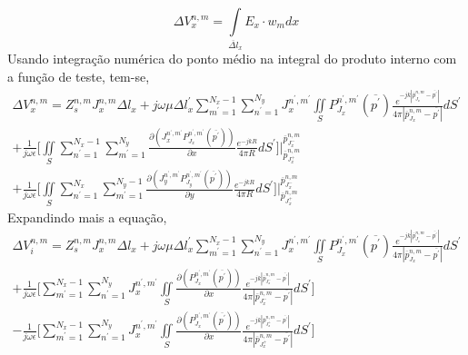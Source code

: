 \documentclass[
	12pt,				%
	openright,			%
	oneside,			%
	a4paper,			%
	english,			%
	brazil				%
	]{abntex2}
\begin{document}
\begin{apendicesenv}
\begin{equation}
     \Delta V_{x}^{n,m}=\int \limits_{\overline{\Delta l}_x}E_{x} \cdot w_m dx
\end{equation}
Usando integração numérica do ponto médio na integral do produto interno com a função de teste,  tem-se,
\begin{equation}
\begin{aligned}
      \Delta V_{x}^{n,m}= Z_s^{n,m}  J_{x}^{n,m}  {\Delta l}_x
      +
j\omega \mu   {\Delta l}^{{'}}_x \sum_{m^{'}=1}^{N_x-1}\sum_{n^{'}=1}^{N_y} J_{x}^{n^{'},m^{'}} \iint\limits_{S}  P_{J_x}^{n^{'},m^{'}}(\overline{p^{'}})   \frac{e^{-j k |\overline{p}_{{J_x}}^{n,m}-\overline{p^{'}}|}}{4 \pi |\overline{p}_{{J_x}}^{n,m}-\overline{p^{'}}|} dS^{'}    \\
   + 
   \frac{1}{j\omega \epsilon}\biggl[ \iint\limits_{S} \sum_{n^{'}=1}^{N_x-1}\sum_{m^{'}=1}^{N_y}\frac{\partial (J_{x}^{n^{'},m^{'}}P_{J_x}^{n^{'},m^{'}}(\overline{p^{'}})  )}{\partial x}  \frac{e^{-j k R}}{4 \pi R} dS^{'}  \biggl] \biggl |_{\overline{p}_{{J_x^{+}}}^{n,m}}^{\overline{p}_{{J_x^{-}}}^{n,m}}\\
  + 
  \frac{1}{j\omega \epsilon}\biggl[ \iint\limits_{S}\sum_{n^{'}=1}^{N_x}\sum_{m^{'}=1}^{N_y-1} \frac{\partial (J_{y}^{n^{'},m^{'}}P_{J_y}^{n^{'},m^{'}} (\overline{p^{'}})    )}{\partial y}  \frac{e^{-j k R}}{4 \pi R} dS^{'}  \biggl] \biggl |_{\overline{p}_{{J_x^{+}}}^{n,m}}^{\overline{p}_{{J_x^{-}}}^{n,m}}
\end{aligned}
\end{equation}
Expandindo mais a equação,
\begin{equation}
\begin{aligned}
      \Delta V_i^{n,m}=Z_s^{n,m}  J_{x}^{n,m} {\Delta l}_x
      +
j\omega \mu  {\Delta l}^{{'}}_x \sum_{m^{'}=1}^{N_x-1}\sum_{n^{'}=1}^{N_y} J_{x}^{n^{'},m^{'}} \iint\limits_{S}  P_{J_x}^{n^{'},m^{'}}(\overline{p^{'}})   \frac{e^{-j k |\overline{p}_{{J_x}}^{n,m}-\overline{p^{'}}|}}{4 \pi |\overline{p}_{{J_x}}^{n,m}-\overline{p^{'}}|} dS^{'}    \\
+
    \frac{1}{j\omega \epsilon}\biggl[\sum_{m^{'}=1}^{N_x-1}\sum_{n^{'}=1}^{N_y} J_{x}^{n^{'},m^{'}} \iint\limits_{S}  \frac{\partial (P_{J_x}^{n^{'},m^{'}}(\overline{p^{'}})    )}{\partial x}  \frac{e^{-j k |\overline{p}_{{J_x^{-}}}^{n,m}-\overline{p^{'}}|}}{4 \pi |\overline{p}_{{J_x^{-}}}^{n,m}-\overline{p^{'}}|} dS^{'}  \biggl] \\
    -
      \frac{1}{j\omega \epsilon}\biggl[ \sum_{m^{'}=1}^{N_x-1}\sum_{n^{'}=1}^{N_y} J_{x}^{n^{'},m^{'}} \iint\limits_{S}  \frac{\partial (P_{J_x}^{n^{'},m^{'}}(\overline{p^{'}})    )}{\partial x} \frac{e^{-j k |\overline{p}_{{J_x^{+}}}^{n,m}-\overline{p^{'}}|}}{4 \pi |\overline{p}_{{J_x^{+}}}^{n,m}-\overline{p^{'}}|}dS^{'}  \biggl] \\

\end{aligned}
\end{equation}
\end{apendicesenv}
\end{document}
